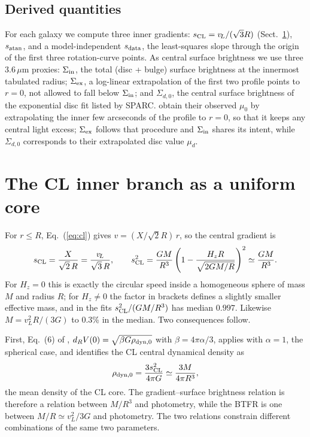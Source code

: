 \documentclass[11pt,a4paper]{article}
\newcommand{\vL}{v_{\!L}}
\newcommand{\sCL}{s_{\rm CL}}
\newcommand{\sat}{s_{\rm atan}}
\newcommand{\sdat}{s_{\rm data}}
\newcommand{\Sin}{\Sigma_{\rm in}}
\begin{document}
\subsection{Derived quantities}
For each galaxy we compute three inner gradients: $\sCL=\vL/(\sqrt3R)$ (Sect.~\ref{sec:core}), $\sat$, and a model-independent $\sdat$, the least-squares slope through the origin of the first three rotation-curve points. As central surface brightness we use three 3.6\,$\mu$m proxies: $\Sin$, the total (disc + bulge) surface brightness at the innermost tabulated radius; $\Sigma_{\rm ex}$, a log-linear extrapolation of the first two profile points to $r=0$, not allowed to fall below $\Sin$; and $\Sigma_{d,0}$, the central surface brightness of the exponential disc fit listed by SPARC. \citet{Lelli2013} obtain their observed $\mu_0$ by extrapolating the inner few arcseconds of the profile to $r=0$, so that it keeps any central light excess; $\Sigma_{\rm ex}$ follows that procedure and $\Sin$ shares its intent, while $\Sigma_{d,0}$ corresponds to their extrapolated disc value $\mu_d$.

\section{The CL inner branch as a uniform core}
\label{sec:core}

For $r\le R$, Eq.~(\ref{eq:cl}) gives $v=(X/\sqrt2R)\,r$, so the central gradient is
\begin{equation}
\sCL=\frac{X}{\sqrt2\,R}=\frac{\vL}{\sqrt3\,R},\qquad
\sCL^2=\frac{GM}{R^3}\left(1-\frac{H_zR}{\sqrt{2GM/R}}\right)^2\simeq\frac{GM}{R^3}.
\label{eq:grad}
\end{equation}
For $H_z=0$ this is exactly the circular speed inside a homogeneous sphere of mass $M$ and radius $R$; for $H_z\neq0$ the factor in brackets defines a slightly smaller effective mass, and in the fits $\sCL^2/(GM/R^3)$ has median $0.997$. Likewise $M=\vL^2R/(3G)$ to $0.3$\% in the median. Two consequences follow.

First, Eq.~(6) of \citet{Lelli2013}, $d_RV(0)=\sqrt{\beta G\rho_{\rm dyn,0}}$ with $\beta=4\pi\alpha/3$, applies with $\alpha=1$, the spherical case, and identifies the CL central dynamical density as
\begin{equation}
\rho_{{\rm dyn},0}=\frac{3\sCL^2}{4\pi G}\simeq\frac{3M}{4\pi R^3},
\label{eq:rho}
\end{equation}
the mean density of the CL core. The gradient--surface brightness relation is therefore a relation between $M/R^3$ and photometry, while the BTFR is one between $M/R\simeq\vL^2/3G$ and photometry. The two relations constrain different combinations of the same two parameters.
\end{document}
